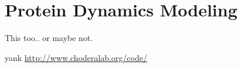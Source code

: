 \section{Protein Dynamics Modeling}
  
This too.. or maybe not.

yank \url{http://www.choderalab.org/code/}